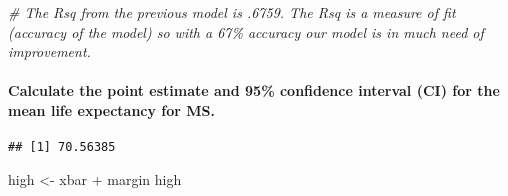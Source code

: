 \documentclass[
]{article}
\newenvironment{Shaded}{\begin{snugshade}}{\end{snugshade}}
\newcommand{\AttributeTok}[1]{\textcolor[rgb]{0.77,0.63,0.00}{#1}}
\newcommand{\CommentTok}[1]{\textcolor[rgb]{0.56,0.35,0.01}{\textit{#1}}}
\newcommand{\ConstantTok}[1]{\textcolor[rgb]{0.00,0.00,0.00}{#1}}
\newcommand{\DecValTok}[1]{\textcolor[rgb]{0.00,0.00,0.81}{#1}}
\newcommand{\FloatTok}[1]{\textcolor[rgb]{0.00,0.00,0.81}{#1}}
\newcommand{\FunctionTok}[1]{\textcolor[rgb]{0.00,0.00,0.00}{#1}}
\newcommand{\NormalTok}[1]{#1}
\newcommand{\OtherTok}[1]{\textcolor[rgb]{0.56,0.35,0.01}{#1}}
\newcommand{\SpecialCharTok}[1]{\textcolor[rgb]{0.00,0.00,0.00}{#1}}
\begin{document}
\begin{Shaded}
\begin{Highlighting}[]
\CommentTok{\# The Rsq from the previous model is .6759. The Rsq is a measure of fit (accuracy of the model) so with a 67\% accuracy our model is in much need of improvement.}
\end{Highlighting}
\end{Shaded}

\hypertarget{calculate-the-point-estimate-and-95-confidence-interval-ci-for-the-mean-life-expectancy-for-ms.}{%
\paragraph{Calculate the point estimate and 95\% confidence interval
(CI) for the mean life expectancy for
MS.}\label{calculate-the-point-estimate-and-95-confidence-interval-ci-for-the-mean-life-expectancy-for-ms.}}

\begin{Shaded}
\end{Shaded}

\begin{verbatim}
## [1] 70.56385
\end{verbatim}

\begin{Shaded}
\begin{Highlighting}[]
\NormalTok{high }\OtherTok{\textless{}{-}}\NormalTok{ xbar }\SpecialCharTok{+}\NormalTok{ margin}
\NormalTok{high}
\end{Highlighting}
\end{Shaded}
\end{document}
